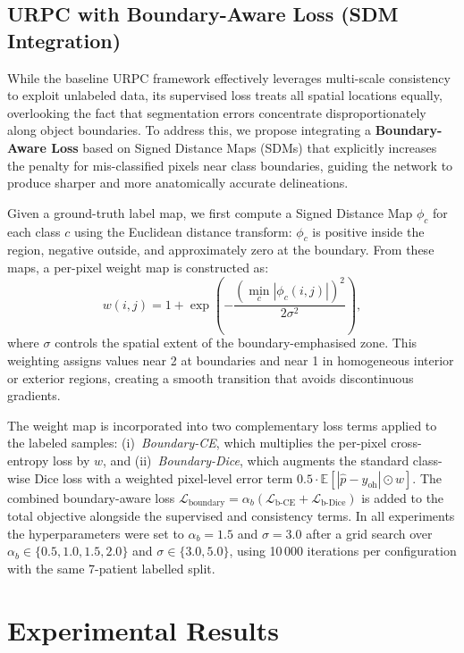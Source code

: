 \subsection{URPC with Boundary-Aware Loss (SDM Integration)}

While the baseline URPC framework effectively leverages multi-scale consistency to exploit unlabeled data, its supervised loss treats all spatial locations equally, overlooking the fact that segmentation errors concentrate disproportionately along object boundaries. To address this, we propose integrating a \textbf{Boundary-Aware Loss} based on Signed Distance Maps (SDMs) that explicitly increases the penalty for mis-classified pixels near class boundaries, guiding the network to produce sharper and more anatomically accurate delineations.

Given a ground-truth label map, we first compute a Signed Distance Map $\phi_c$ for each class $c$ using the Euclidean distance transform: $\phi_c$ is positive inside the region, negative outside, and approximately zero at the boundary. From these maps, a per-pixel weight map is constructed as:
\begin{equation}
    w(i,j) = 1 + \exp\!\left(-\frac{(\min_c |\phi_c(i,j)|)^2}{2\sigma^2}\right),
    \label{eq:boundary-weight}
\end{equation}
where $\sigma$ controls the spatial extent of the boundary-emphasised zone. This weighting assigns values near 2 at boundaries and near 1 in homogeneous interior or exterior regions, creating a smooth transition that avoids discontinuous gradients.

The weight map is incorporated into two complementary loss terms applied to the labeled samples: (i)~\emph{Boundary-CE}, which multiplies the per-pixel cross-entropy loss by $w$, and (ii)~\emph{Boundary-Dice}, which augments the standard class-wise Dice loss with a weighted pixel-level error term $0.5 \cdot \mathbb{E}[|\hat{p} - y_{\text{oh}}| \odot w]$. The combined boundary-aware loss $\mathcal{L}_{\text{boundary}} = \alpha_b (\mathcal{L}_{\text{b-CE}} + \mathcal{L}_{\text{b-Dice}})$ is added to the total objective alongside the supervised and consistency terms. In all experiments the hyperparameters were set to $\alpha_b = 1.5$ and $\sigma = 3.0$ after a grid search over $\alpha_b \in \{0.5, 1.0, 1.5, 2.0\}$ and $\sigma \in \{3.0, 5.0\}$, using 10\,000 iterations per configuration with the same 7-patient labelled split.


\section{Experimental Results}

